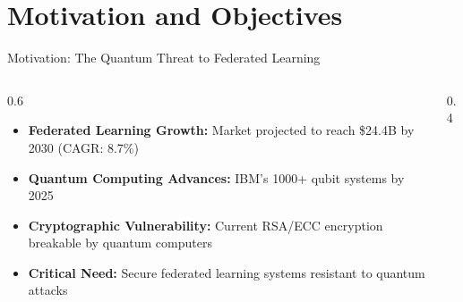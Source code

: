 \documentclass[aspectratio=169,11pt]{beamer}
\newcommand{\highlight}[1]{\textcolor{qflareblue}{\textbf{#1}}}
\begin{document}
\section{Motivation and Objectives}
\begin{frame}{Motivation: The Quantum Threat to Federated Learning}

\begin{columns}
\begin{column}{0.6\textwidth}
\begin{itemize}
    \item \highlight{Federated Learning Growth:} Market projected to reach \$24.4B by 2030 (CAGR: 8.7\%)
    \item \highlight{Quantum Computing Advances:} IBM's 1000+ qubit systems by 2025
    \item \highlight{Cryptographic Vulnerability:} Current RSA/ECC encryption breakable by quantum computers
    \item \highlight{Critical Need:} Secure federated learning systems resistant to quantum attacks
\end{itemize}
\end{column}

\begin{column}{0.4\textwidth}
\end{column}
\end{columns}

\end{frame}
\end{document}
